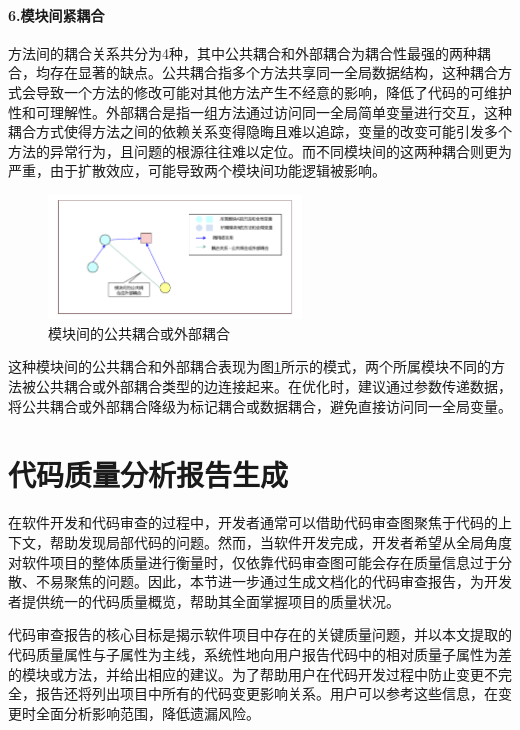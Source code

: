 \paragraph{6.模块间紧耦合} 方法间的耦合关系共分为4种，其中公共耦合和外部耦合为耦合性最强的两种耦合，均存在显著的缺点。公共耦合指多个方法共享同一全局数据结构，这种耦合方式会导致一个方法的修改可能对其他方法产生不经意的影响，降低了代码的可维护性和可理解性。外部耦合是指一组方法通过访问同一全局简单变量进行交互，这种耦合方式使得方法之间的依赖关系变得隐晦且难以追踪，变量的改变可能引发多个方法的异常行为，且问题的根源往往难以定位。而不同模块间的这两种耦合则更为严重，由于扩散效应，可能导致两个模块间功能逻辑被影响。


\begin{figure}[h]
\centering
\includegraphics[width = 0.6\textwidth]{figures/模块间公共耦合.pdf}
\caption{模块间的公共耦合或外部耦合}
\label{1_模块间的公共耦合或外部耦合}
\end{figure}

这种模块间的公共耦合和外部耦合表现为图\ref{1_模块间的公共耦合或外部耦合}所示的模式，两个所属模块不同的方法被公共耦合或外部耦合类型的边连接起来。在优化时，建议通过参数传递数据，将公共耦合或外部耦合降级为标记耦合或数据耦合，避免直接访问同一全局变量。



\section{代码质量分析报告生成}

在软件开发和代码审查的过程中，开发者通常可以借助代码审查图聚焦于代码的上下文，帮助发现局部代码的问题。然而，当软件开发完成，开发者希望从全局角度对软件项目的整体质量进行衡量时，仅依靠代码审查图可能会存在质量信息过于分散、不易聚焦的问题。因此，本节进一步通过生成文档化的代码审查报告，为开发者提供统一的代码质量概览，帮助其全面掌握项目的质量状况。

代码审查报告的核心目标是揭示软件项目中存在的关键质量问题，并以本文提取的代码质量属性与子属性为主线，系统性地向用户报告代码中的相对质量子属性为差的模块或方法，并给出相应的建议。为了帮助用户在代码开发过程中防止变更不完全，报告还将列出项目中所有的代码变更影响关系。用户可以参考这些信息，在变更时全面分析影响范围，降低遗漏风险。

